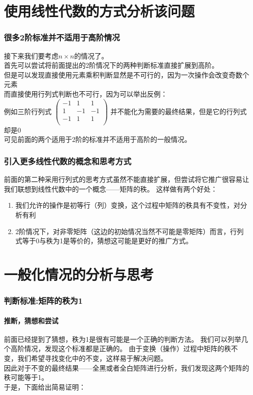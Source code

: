 \documentclass[UTF-8,a4paper]{ctexart}
\begin{document}
\part{使用线性代数的方式分析该问题}
\section{很多2阶标准并不适用于高阶情况}
接下来我们要考虑\(n \times n\)的情况了。\\
首先可以尝试将前面提出的2阶情况下的两种判断标准直接扩展到高阶。\\
但是可以发现直接使用元素乘积判断显然是不可行的，因为一次操作会改变奇数个元素\\
而直接使用行列式判断也不可行，因为可以举出反例：\\
\kaishu
例如三阶行列式
\(\begin{pmatrix}
    -1&1&1\\
    1&-1&-1\\
    -1&1&1\\
\end{pmatrix}\)
\quad
并不能化为需要的最终结果，但是它的行列式却是0\\
\songti
可见前面的两个适用于2阶的标准并不适用于高阶的一般情况。
\section{引入更多线性代数的概念和思考方式}
前面的第二种采用行列式的思考方式虽然不能直接扩展，但尝试将它推广很容易让我们联想到线性代数中的一个概念——矩阵的秩。
这样做有两个好处：
\kaishu
\begin{enumerate}
    \item 我们允许的操作是初等行（列）变换，这个过程中矩阵的秩具有不变性，对分析有利
    \item 2阶情况下，对非零矩阵（这边的初始情况当然不可能是零矩阵）而言，行列式等于0与秩为1是等价的，猜想这可能是更好的推广方式。
\end{enumerate}
\songti
\part{一般化情况的分析与思考}
\section{判断标准:矩阵的秩为1}
\subsection{推断，猜想和尝试}
前面已经提到了猜想，秩为1是很有可能是一个正确的判断方法。
我们可以列举几个高阶情况，发现这个标准都是正确的。
由于变换（操作）过程中矩阵的秩不变，我们希望寻找变化中的不变，这样易于解决问题。
\\因此对于不变的最终结果——全黑或者全白矩阵进行分析，我们发现这两个矩阵的秩可能等于1。
\\于是，下面给出简易证明：
\end{document}
